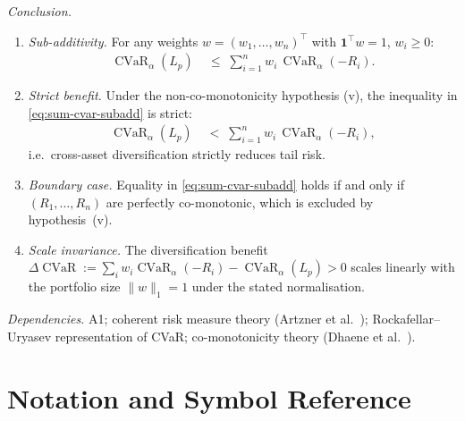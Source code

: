 \documentclass[12pt,openany]{book}
\newcommand{\bfw}{\mathbf{w}}
\newcommand{\bfone}{\mathbf{1}}
\DeclareMathOperator{\CVaR}{CVaR}
\numberwithin{equation}{chapter}
\theoremstyle{plain}
\theoremstyle{definition}
\theoremstyle{remark}
\def\bfw{w}%
\begin{document}
\begin{enumerate}[label=\textbf{C\arabic*.}, leftmargin=*, widest=C4,
                  itemsep=6pt, parsep=2pt]
        \emph{Conclusion.}
        \begin{enumerate}[label=(\alph*), itemsep=2pt]
          \item \emph{Sub-additivity.}  For any weights
                $\bfw = (w_1,\ldots,w_n)^\top$ with
                $\bfone^\top\bfw = 1$, $w_i \geq 0$:
                \begin{align}
                  \CVaR_\alpha(L_p)
                    &\;\leq\;
                      \sum_{i=1}^n w_i\,\CVaR_\alpha(-R_i).
                  \label{eq:sum-cvar-subadd}
                \end{align}
          \item \emph{Strict benefit.}  Under the non-co-monotonicity
                hypothesis (v), the inequality in
                \eqref{eq:sum-cvar-subadd} is strict:
                \begin{align}
                  \CVaR_\alpha(L_p)
                    &\;<\;
                      \sum_{i=1}^n w_i\,\CVaR_\alpha(-R_i),
                  \label{eq:sum-cvar-strict}
                \end{align}
                i.e.\ cross-asset diversification strictly reduces
                tail risk.
          \item \emph{Boundary case.}  Equality in
                \eqref{eq:sum-cvar-subadd} holds if and only if
                $(R_1,\ldots,R_n)$ are perfectly co-monotonic,
                which is excluded by hypothesis~(v).
          \item \emph{Scale invariance.}
                The diversification benefit
                $\Delta\CVaR := \sum_i w_i\CVaR_\alpha(-R_i)
                - \CVaR_\alpha(L_p) > 0$ scales linearly
                with the portfolio size $\|\bfw\|_1 = 1$ under
                the stated normalisation.
        \end{enumerate}

        \emph{Dependencies.} A1; coherent risk measure theory
        (Artzner et al.~\cite{artzner1999}); Rockafellar--Uryasev
        representation of CVaR; co-monotonicity theory
        (Dhaene et al.~\cite{dhaene2002}).

\end{enumerate}



\chapter*{Notation and Symbol Reference}
\label{ch:notation}
\end{document}

